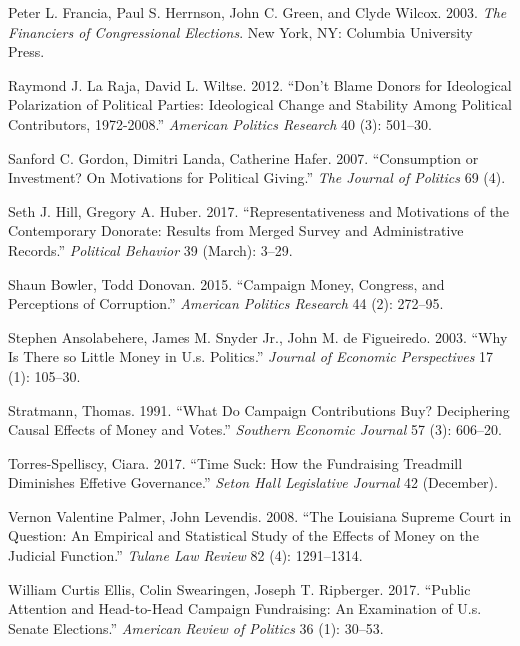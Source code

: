 \documentclass[11pt,]{article}
\begin{document}
\leavevmode\hypertarget{ref-francia2003}{}%
Peter L. Francia, Paul S. Herrnson, John C. Green, and Clyde Wilcox.
2003. \emph{The Financiers of Congressional Elections}. New York, NY:
Columbia University Press.

\leavevmode\hypertarget{ref-laraja2011}{}%
Raymond J. La Raja, David L. Wiltse. 2012. ``Don't Blame Donors for
Ideological Polarization of Political Parties: Ideological Change and
Stability Among Political Contributors, 1972-2008.'' \emph{American
Politics Research} 40 (3): 501--30.

\leavevmode\hypertarget{ref-gordon2007}{}%
Sanford C. Gordon, Dimitri Landa, Catherine Hafer. 2007. ``Consumption
or Investment? On Motivations for Political Giving.'' \emph{The Journal
of Politics} 69 (4).

\leavevmode\hypertarget{ref-hill2017}{}%
Seth J. Hill, Gregory A. Huber. 2017. ``Representativeness and
Motivations of the Contemporary Donorate: Results from Merged Survey and
Administrative Records.'' \emph{Political Behavior} 39 (March): 3--29.

\leavevmode\hypertarget{ref-bowler2015}{}%
Shaun Bowler, Todd Donovan. 2015. ``Campaign Money, Congress, and
Perceptions of Corruption.'' \emph{American Politics Research} 44 (2):
272--95.

\leavevmode\hypertarget{ref-ansolabehere2003}{}%
Stephen Ansolabehere, James M. Snyder Jr., John M. de Figueiredo. 2003.
``Why Is There so Little Money in U.s. Politics.'' \emph{Journal of
Economic Perspectives} 17 (1): 105--30.

\leavevmode\hypertarget{ref-stratmann1991}{}%
Stratmann, Thomas. 1991. ``What Do Campaign Contributions Buy?
Deciphering Causal Effects of Money and Votes.'' \emph{Southern Economic
Journal} 57 (3): 606--20.

\leavevmode\hypertarget{ref-torres-spelliscy2017}{}%
Torres-Spelliscy, Ciara. 2017. ``Time Suck: How the Fundraising
Treadmill Diminishes Effetive Governance.'' \emph{Seton Hall Legislative
Journal} 42 (December).

\leavevmode\hypertarget{ref-palmer2008}{}%
Vernon Valentine Palmer, John Levendis. 2008. ``The Louisiana Supreme
Court in Question: An Empirical and Statistical Study of the Effects of
Money on the Judicial Function.'' \emph{Tulane Law Review} 82 (4):
1291--1314.

\leavevmode\hypertarget{ref-ellis2017}{}%
William Curtis Ellis, Colin Swearingen, Joseph T. Ripberger. 2017.
``Public Attention and Head-to-Head Campaign Fundraising: An Examination
of U.s. Senate Elections.'' \emph{American Review of Politics} 36 (1):
30--53.





\newpage
\singlespacing 
\end{document}
